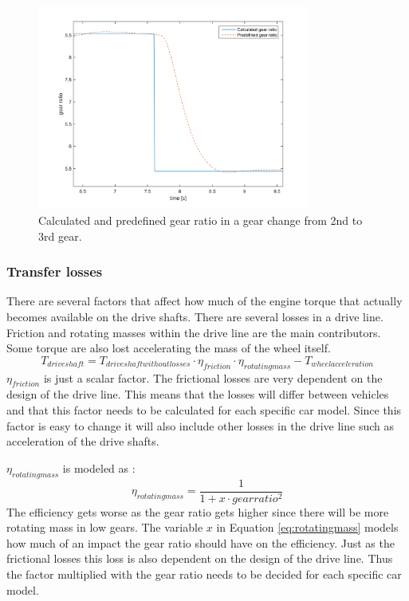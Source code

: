 \begin{figure}[h]
	\centering
	\includegraphics[width=0.8\textwidth]{Pictures/gear_ratio}
	\caption{Calculated and predefined gear ratio in a gear change from 2nd to 3rd gear.}
	\label{gear_ratio}
\end{figure}

\subsubsection{Transfer losses}
There are several factors that affect how much of the engine torque that actually becomes available on the drive shafts. There are several losses in a drive line. Friction and rotating masses within the drive line are the main contributors. Some torque are also lost accelerating the mass of the wheel itself.
\begin{equation}
T_{driveshaft} = T_{driveshaftwithoutlosses}\cdot\eta_{friction}\cdot\eta_{rotating mass} - T_{wheelacceleration}
\end{equation}
$ \eta_{friction} $ is just a scalar factor. The frictional losses are very dependent on the design of the drive line. This means that the losses will differ between vehicles and that this factor needs to be calculated for each specific car model. Since this factor is easy to change it will also include other losses in the drive line such as acceleration of the drive shafts. 

$ \eta_{rotating mass} $ is modeled as \cite{mason}:
\begin{equation} \label{eq:rotatingmass}
	\eta_{rotating mass} = \frac{1}{1 + x\cdot gearratio^2}
\end{equation}
The efficiency gets worse as the gear ratio gets higher since there will be more rotating mass in low gears. The variable $ x $ in Equation \ref{eq:rotatingmass} models how much of an impact the gear ratio should have on the efficiency. Just as the frictional losses this loss is also dependent on the design of the drive line. Thus the factor multiplied with the gear ratio needs to be decided for each specific car model.

